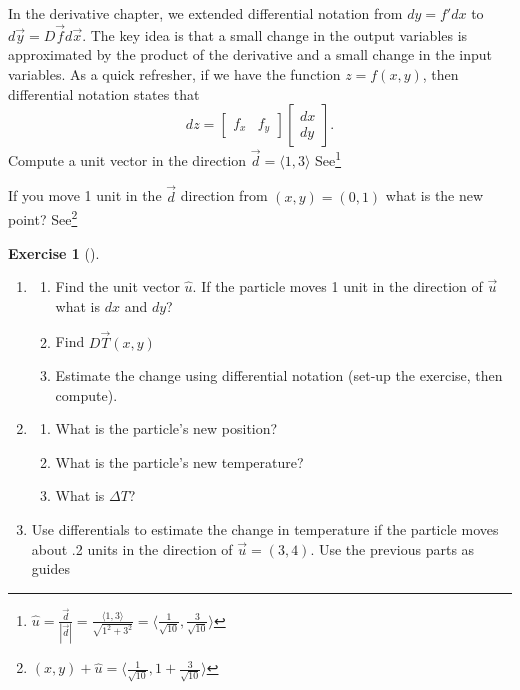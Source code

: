 \documentclass[10pt,]{book}
\theoremstyle{plain}
\theoremstyle{definition}
\theoremstyle{definition}
\theoremstyle{definition}
\theoremstyle{definition}
\newtheorem{exploration}[project]{Exercise}
\theoremstyle{definition}
\numberwithin{equation}{section}
\newcommand{\amp}{&}
\begin{document}
In the derivative chapter, we extended differential notation from \(dy=f' dx\) to \(d\vec y = D\vec f d\vec x\). The key idea is that a small change in the output variables is approximated by the product of the derivative and a small change in the input variables. As a quick refresher, if we have the function \(z=f(x,y)\), then differential notation states that%
\begin{equation*}
dz = \begin{bmatrix}f_x\amp f_y
\end{bmatrix}  \begin{bmatrix}dx\\dy
\end{bmatrix} .
\end{equation*}
%
Compute a unit vector in the direction \(\vec{d}=\langle 1,3 \rangle\) See\footnote{\(\hat{u}=\frac{\vec{d}}{|\vec{d}|}=\frac{\langle 1,3 \rangle}{\sqrt{1^2+3^2}}=\langle \frac{1}{\sqrt{10}}, \frac{3}{\sqrt{10}} \rangle\)\label{fn-21}}%
 \par
If you move 1 unit in the \(\vec{d}\) direction from \((x,y)=(0,1)\) what is the new point? See\footnote{\((x,y)+\hat{u}=\langle \frac{1}{\sqrt{10}}, 1+\frac{3}{\sqrt{10}} \rangle\)\label{fn-22}}%
\begin{exploration}[]\label{exploration-225}
\leavevmode%
\begin{enumerate}[font=\bfseries,label=(\alph*),ref=\alph*]
\item\label{task-593} \begin{enumerate}[font=\bfseries,label=(\roman*),ref=\theenumi.\roman*]
\item\label{task-594} Find the unit vector \(\hat{u}\). If the particle moves 1 unit in the direction of \(\vec{u}\) what is \(dx\) and \(dy\)?%
\item\label{task-595} Find \(D\vec{T}(x,y)\)%
\item\label{task-596} Estimate the change using differential notation (set-up the exercise, then compute).%
\end{enumerate}
\item\label{task-597} \begin{enumerate}[font=\bfseries,label=(\roman*),ref=\theenumi.\roman*]
\item\label{task-598} What is the particle's new position?%
\item\label{task-599} What is the particle's new temperature?%
\item\label{task-600} What is \(\Delta T\)?%
\end{enumerate}
\item\label{task-601} Use differentials to estimate the change in temperature if the particle moves about .2 units in the direction of \(\vec u=\left(3,4\right)\). Use the previous parts as guides%
%
\end{enumerate}
\end{exploration}
\end{document}
